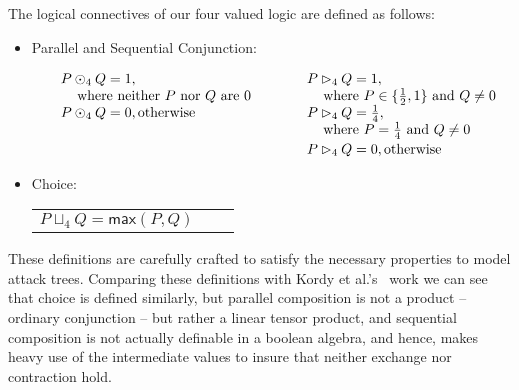 \begin{definition}
  \label{def:logical-connectives}
  The logical connectives of our four valued logic are defined as
  follows:\vspace{-5px}
  \begin{itemize}
  \item[] Parallel and Sequential Conjunction:\vspace{-19px}
    \begin{center}
      \begin{math}
        \setlength{\arraycolsep}{10px}
        \begin{array}{lll}
          \begin{array}{lll}
            P \odot_4 Q = 1,\\
            \,\,\,\,\,\,\,\text{where neither $P$ nor $Q$ are $0$}\\
          P \odot_4 Q = 0, \text{otherwise}\\
          \\[14px]
        \end{array}
        &
        \begin{array}{lll}          
          P \rhd_4 Q = 1,\\
          \,\,\,\,\,\,\,\text{where } P \in \{\half, 1\} \text{ and } Q \neq 0\\
          P \rhd_4 Q = \forth, \\
          \,\,\,\,\,\,\,\text{where $P = \forth$ and $Q \neq 0$}\\[2px]         
          P \rhd_4 Q = 0, \text{otherwise}
        \end{array}
        \end{array}
      \end{math}
    \end{center}
    \vspace{-5px}
  \item[] Choice: \\    
    \begin{tabular}{lll}
      \hspace{19px}$P \sqcup_4 Q = \mathsf{max}(P,Q)$    
    \end{tabular}
  \end{itemize}
\end{definition}
These definitions are carefully crafted to satisfy the necessary
properties to model attack trees.  Comparing these definitions with
Kordy et al.'s~\cite{Kordy:2012} work we can see that choice is
defined similarly, but parallel composition is not a product --
ordinary conjunction -- but rather a linear tensor product, and
sequential composition is not actually definable in a boolean algebra,
and hence, makes heavy use of the intermediate values to insure that
neither exchange nor contraction hold.  

